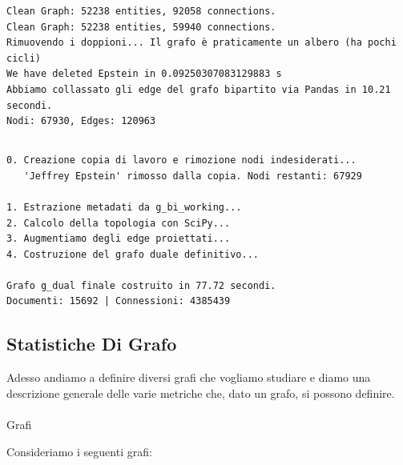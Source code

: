 \documentclass[
  italian,
  a4paper,
]{article}
\makeatletter
\let\oldparagraph\paragraph
\renewcommand{\paragraph}{
    \@ifstar
      \xxxParagraphStar
      \xxxParagraphNoStar
  }
\newcommand{\xxxParagraphStar}[1]{\oldparagraph*{#1}\mbox{}}
\newcommand{\xxxParagraphNoStar}[1]{\oldparagraph{#1}\mbox{}}
\makeatother
\begin{document}
\begin{verbatim}
Clean Graph: 52238 entities, 92058 connections.
Clean Graph: 52238 entities, 59940 connections.
Rimuovendo i doppioni... Il grafo è praticamente un albero (ha pochi cicli)
We have deleted Epstein in 0.09250307083129883 s
Abbiamo collassato gli edge del grafo bipartito via Pandas in 10.21 secondi.
Nodi: 67930, Edges: 120963
\end{verbatim}

\subsection{}\label{section}

\begin{verbatim}
0. Creazione copia di lavoro e rimozione nodi indesiderati...
   'Jeffrey Epstein' rimosso dalla copia. Nodi restanti: 67929

1. Estrazione metadati da g_bi_working...
2. Calcolo della topologia con SciPy...
3. Augmentiamo degli edge proiettati...
4. Costruzione del grafo duale definitivo...

Grafo g_dual finale costruito in 77.72 secondi.
Documenti: 15692 | Connessioni: 4385439
\end{verbatim}

\subsection{Statistiche Di Grafo}\label{statistiche-di-grafo}

Adesso andiamo a definire diversi grafi che vogliamo studiare e diamo
una descrizione generale delle varie metriche che, dato un grafo, si
possono definire.

\paragraph{Grafi}\label{grafi-1}

Consideriamo i seguenti grafi:
\end{document}
